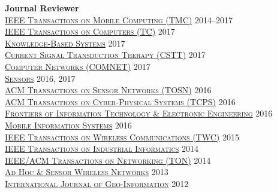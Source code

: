 {\bf Journal Reviewer}\\
{\href{http://www.computer.org/portal/web/tmc}{\textsc{IEEE Transactions on Mobile Computing (TMC)}}} \hfill 2014--2017\\
{\href{https://www.computer.org/web/tc}{\textsc{IEEE Transactions on Computers (TC)}}} \hfill 2017\\
{\href{https://www.journals.elsevier.com/knowledge-based-systems}{\textsc{Knowledge-Based Systems}}} \hfill 2017\\
{\href{http://benthamscience.com/journals/current-signal-transduction-therapy/}{\textsc{Current Signal Transduction Therapy (CSTT)}}} \hfill 2017\\
{\href{http://ees.elsevier.com/comnet/}{\textsc{Computer Networks (COMNET)}}} \hfill 2017\\
{\href{http://www.mdpi.com/journal/sensors}{\textsc{Sensors}}} \hfill 2016, 2017\\
{\href{http://tosn.acm.org/}{\textsc{ACM Transactions on Sensor Networks (TOSN)}}} \hfill 2016\\
{\href{http://tcps.acm.org/}{\textsc{ACM Transactions on Cyber-Physical Systems (TCPS)}}} \hfill 2016\\
{\href{http://www.springer.com/computer/journal/11714}{\textsc{Frontiers of Information Technology \& Electronic Engineering}}} \hfill 2016\\
{\href{https://www.hindawi.com/journals/misy/}{\textsc{Mobile Information Systems}}} \hfill 2016\\
{\href{http://www.comsoc.org/twc}{\textsc{IEEE Transactions on Wireless Communications (TWC)}}} \hfill 2015\\
{\href{http://tii.ieee-ies.org}{\textsc{IEEE Transactions on Industrial Informatics}}} \hfill 2014\\
{\href{http://www.ifp.illinois.edu/ton}{\textsc{IEEE/ACM Transactions on Networking (TON)}}} \hfill 2014\\
{\href{http://www.oldcitypublishing.com/AHSWN/AHSWN.html}{\textsc{Ad Hoc \& Sensor Wireless Networks}}} \hfill 2013\\
{\href{http://www.mdpi.com/journal/ijgi}{\textsc{International Journal of Geo-Information}}} \hfill 2012\\
